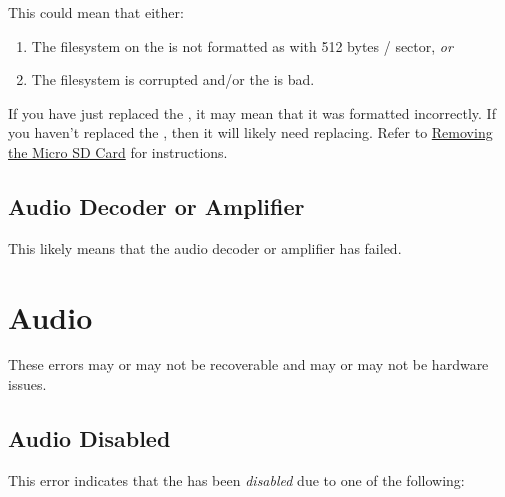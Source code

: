 This could mean that either:

\begin{enumerate}
  \item The filesystem on the  is not formatted as  with
    \num{512} bytes / sector, \textit{or}
  \item The filesystem is corrupted and/or the  is bad.
\end{enumerate}

If you have just replaced the , it may mean that it was formatted
incorrectly.  If you haven't replaced the , then it will likely need
replacing.  Refer to \hyperref[Removing SD Card]{Removing the Micro SD Card}
for instructions.

\subsection{Audio Decoder or Amplifier}

 

\par\bigskip

This likely means that the audio decoder or amplifier has failed.

\section{Audio}

These errors may or may not be recoverable and may or may not be hardware
issues.

\subsection{Audio Disabled}

 

\par\bigskip

This error indicates that the  has been \textit{disabled} due to one of
the following:

